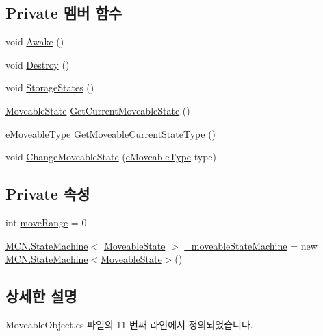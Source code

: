\subsection*{Private 멤버 함수}
\begin{DoxyCompactItemize}
\item 
void \hyperlink{class_moveable_object_ac937cc3f450cfb27c74f4de180c4de24}{Awake} ()
\item 
void \hyperlink{class_moveable_object_a89479f589ce63f7925cf6cd15e4aabef}{Destroy} ()
\item 
void \hyperlink{class_moveable_object_a1cd5235b78466505ca3950d852287615}{Storage\+States} ()
\item 
\hyperlink{class_moveable_object_1_1_moveable_state}{Moveable\+State} \hyperlink{class_moveable_object_a1fd6f362fa5243bf6ba3adfac8980ad1}{Get\+Current\+Moveable\+State} ()
\item 
\hyperlink{_moveable_object_8cs_a90215797ba850e199f3ef63d7c56f132}{e\+Moveable\+Type} \hyperlink{class_moveable_object_a41840d658f3ae47083b026955075c62f}{Get\+Moveable\+Current\+State\+Type} ()
\item 
void \hyperlink{class_moveable_object_a35e45dfc7967725cca99c52762a1ffdf}{Change\+Moveable\+State} (\hyperlink{_moveable_object_8cs_a90215797ba850e199f3ef63d7c56f132}{e\+Moveable\+Type} type)
\end{DoxyCompactItemize}
\subsection*{Private 속성}
\begin{DoxyCompactItemize}
\item 
int \hyperlink{class_moveable_object_a5453d85915073df751887c9ca9480405}{move\+Range} = 0
\item 
\hyperlink{class_m_c_n_1_1_state_machine}{M\+C\+N.\+State\+Machine}$<$ \hyperlink{class_moveable_object_1_1_moveable_state}{Moveable\+State} $>$ \hyperlink{class_moveable_object_a3abd653cd978a7bdbb391a4c86f7d75f}{\+\_\+moveable\+State\+Machine} = new \hyperlink{class_m_c_n_1_1_state_machine}{M\+C\+N.\+State\+Machine}$<$\hyperlink{class_moveable_object_1_1_moveable_state}{Moveable\+State}$>$()
\end{DoxyCompactItemize}


\subsection{상세한 설명}


Moveable\+Object.\+cs 파일의 11 번째 라인에서 정의되었습니다.



